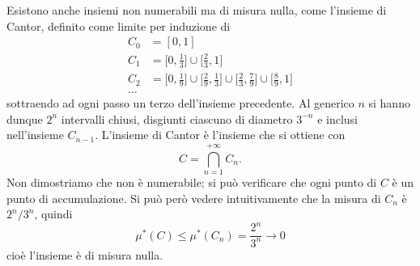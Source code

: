 Esistono anche insiemi non numerabili ma di misura nulla, come l'insieme di Cantor, definito come limite per induzione di
\begin{equation}
	\begin{aligned}
		C_0&=[0,1]\\
		C_1&=\Big[0,\frac13\Big]\cup\Big[\frac23,1\Big]\\
		C_2&=\Big[0,\frac19\Big]\cup\Big[\frac29,\frac13\Big]\cup\Big[\frac23,\frac79\Big]\cup\Big[\frac89,1\Big]\\
		\dots
	\end{aligned}
\end{equation}
sottraendo ad ogni passo un terzo dell'insieme precedente.
Al generico $n$ si hanno dunque $2^n$ intervalli chiusi, disgiunti ciascuno di diametro $3^{-n}$ e inclusi nell'insieme $C_{n-1}$.
L'insieme di Cantor è l'insieme che si ottiene con
\begin{equation}
	C=\bigcap_{n=1}^{+\infty}C_n.
\end{equation}
Non dimostriamo che non è numerabile; si può verificare che ogni punto di $C$ è un punto di accumulazione.
Si può però vedere intuitivamente che la misura di $C_n$ è $2^n/3^n$, quindi
\begin{equation}
	\mu^*(C)\leq\mu^*(C_n)=\frac{2^n}{3^n}\to 0
\end{equation}
cioè l'insieme è di misura nulla.

